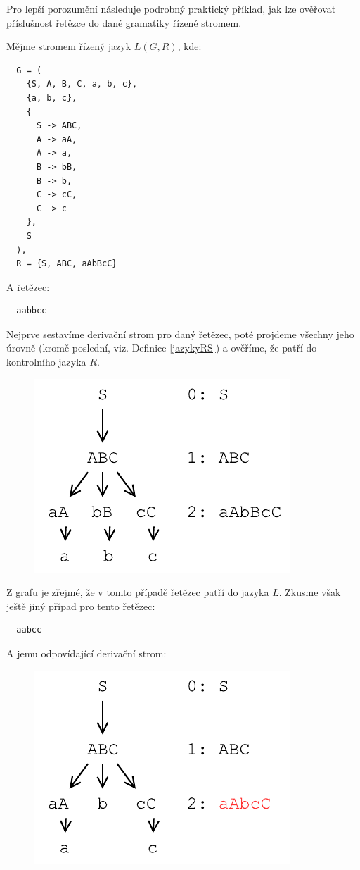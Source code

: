 Pro lepší porozumění následuje podrobný praktický příklad, jak lze
ověřovat příslušnost řetězce do dané gramatiky řízené stromem.

\begin{exmp}
  Mějme stromem řízený jazyk $L(G, R)$, kde:
  \begin{lstlisting}
  G = (
    {S, A, B, C, a, b, c},
    {a, b, c},
    {
      S -> ABC,
      A -> aA,
      A -> a,
      B -> bB,
      B -> b,
      C -> cC,
      C -> c
    },
    S
  ),
  R = {S, ABC, aAbBcC}
  \end{lstlisting}
  \noindent
  A řetězec:

  \begin{lstlisting}
  aabbcc
  \end{lstlisting}

  \noindent
  Nejprve sestavíme derivační strom pro daný řetězec, poté projdeme všechny
  jeho úrovně (kromě poslední, viz. Definice \ref{jazykyRS}) a
  ověříme, že patří do kontrolního jazyka $R$.

  \begin{figure}[H]
    \centering
    \includegraphics{fig/TreeControlledGrammar1.pdf}
  \end{figure}

  \noindent
  Z grafu je zřejmé, že v tomto případě řetězec patří do jazyka $L$.
  Zkusme však ještě jiný případ pro tento řetězec:

  \begin{lstlisting}
  aabcc
  \end{lstlisting}

  \noindent
  A jemu odpovídající derivační strom:
  \begin{figure}[H]
    \centering
    \includegraphics{fig/TreeControlledGrammar2.pdf}
  \end{figure}


\end{exmp}
